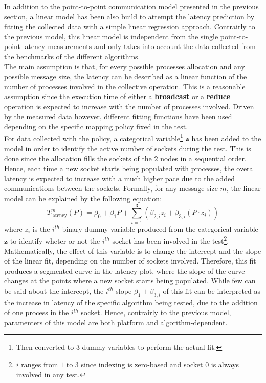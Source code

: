 \documentclass[../main.tex]{subfiles}
\begin{document}
In addition to the point-to-point communication model presented in the previous section, a linear model has been also build to attempt the latency prediction by fitting the collected data with a simple linear regression approach.
Contrairly to the previous model, this linear model is independent from the single point-to-point latency measurements and only takes into account the data collected from the benchmarks of the different algorithms.\\
The main assumption is that, for every possible processes  allocation and any possible message size, the latency can be described as a linear function of the number of processes involved in the collective operation. This is a reasonable assumption since the execution time of either a \textbf{broadcast} or a \textbf{reduce} operation is expected to increase with the number of processes involved. Driven by the measured data however, different fitting functions have been used depending on the specific mapping policy fixed in the test.\\
For data collected with the  policy, a categorical variable\footnote{Then converted to $3$ dummy variables to perform the actual fit.} $\mathbf{z}$ has been added to the model in order to identify the active number of sockets during the test. This is done since the  allocation fills the sockets of the $2$ nodes in a sequential order. Hence, each time a new socket starts being populated with processes, the overall latency is expected to increase with a much higher pace due to the added communications between the sockets. Formally, for any message size $m$, the linear model can be explained by the following equation:
\begin{equation}\label{eq:linear-core}
    T^{m}_{\text{latency}}(P) = \beta_0 + \beta_1 P + \sum_{i=1}^{3} \left(\beta_{2,i} z_i + \beta_{3,i} (P \cdot z_i) \right)
\end{equation}
where $z_i$ is the $i^{th}$ binary dummy variable produced from the categorical variable $\mathbf{z}$ to identify wheter or not the $i^{th}$ socket has been involved in the test\footnote{$i$ ranges from $1$ to $3$ since indexing is zero-based and socket $0$ is always involved in any test.}. Mathematically, the effect of this variable is to change the intercept and the slope of the linear fit, depending on the number of sockets involved. Therefore, this fit produces a segmented curve in the latency plot, where the slope of the curve changes at the points where a new socket starts being populated. While few can be said about the intercept, the $i^{th}$ slope $\beta_1 + \beta_{3,i}$ of this fit can be interpreted as the increase in latency of the specific algorithm being tested, due to the addition of one process in the $i^{th}$ socket. Hence, contrairly to the previous model, paramenters of this model are both platform and algorithm-dependent.\\
\end{document}

